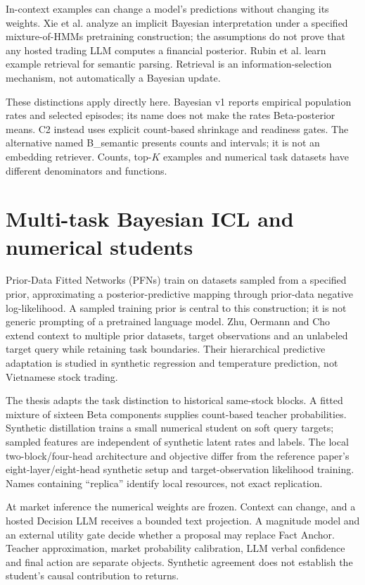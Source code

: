 In-context examples can change a model's predictions without changing its
weights. Xie et al. analyze an implicit Bayesian interpretation under a
specified mixture-of-HMMs pretraining construction; the assumptions do
not prove that any hosted trading LLM computes a financial posterior.
\autocite{xie2022implicitbayes} Rubin et al. learn example retrieval for
semantic parsing. Retrieval is an information-selection mechanism, not
automatically a Bayesian update. \autocite{rubin2022retrieve}

These distinctions apply directly here. Bayesian v1 reports empirical
population rates and selected episodes; its name does not make the rates
Beta-posterior means. C2 instead uses explicit count-based shrinkage and
readiness gates. The alternative named B\_semantic presents counts and
intervals; it is not an embedding retriever. Counts, top-$K$ examples and
numerical task datasets have different denominators and functions.

\section{Multi-task Bayesian ICL and numerical students}\label{s:b46bc1f71efb86f5}
Prior-Data Fitted Networks (PFNs) train on datasets sampled from a specified
prior, approximating a posterior-predictive mapping through prior-data
negative log-likelihood. A sampled training prior is central to this
construction; it is not generic prompting of a pretrained language model.
\autocite{muller2022transformers} Zhu, Oermann and Cho extend context to
multiple prior datasets, target observations and an unlabeled target
query while retaining task boundaries. Their hierarchical predictive
adaptation is studied in synthetic regression and temperature prediction,
not Vietnamese stock trading. \autocite{zhu2026multitask}

The thesis adapts the task distinction to historical same-stock blocks.
A fitted mixture of sixteen Beta components supplies count-based teacher
probabilities. Synthetic distillation trains a small numerical student
on soft query targets; sampled features are independent of synthetic
latent rates and labels. The local two-block/four-head architecture and
objective differ from the reference paper's eight-layer/eight-head
synthetic setup and target-observation likelihood training. Names
containing ``replica'' identify local resources, not exact replication.

At market inference the numerical weights are frozen. Context can change,
and a hosted Decision LLM receives a bounded text projection. A magnitude
model and an external utility gate decide whether a proposal may replace
Fact Anchor. Teacher approximation, market probability calibration, LLM
verbal confidence and final action are separate objects. Synthetic
agreement does not establish the student's causal contribution to returns.

